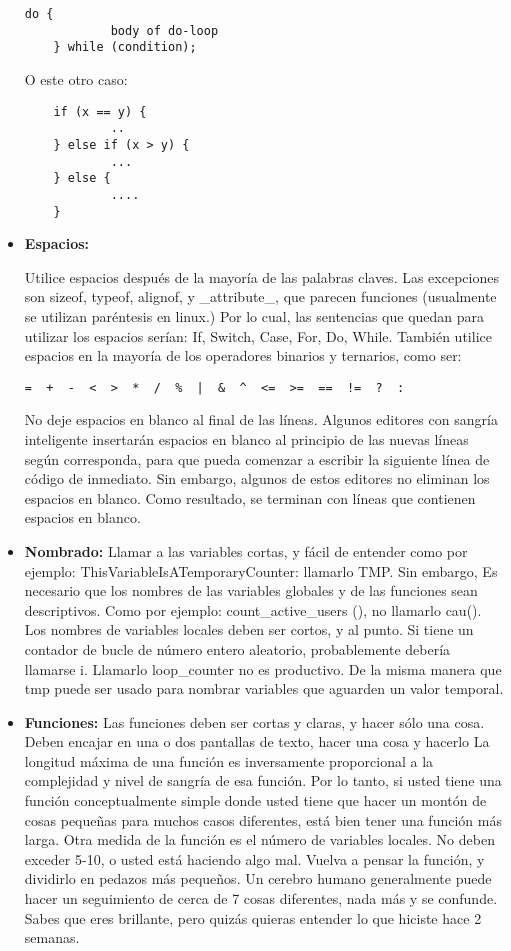 \begin{itemize}
\begin{verbatim}
do {
	        body of do-loop
	} while (condition);
\end{verbatim}
O este otro caso:
\begin{verbatim}
	if (x == y) {
	        ..
	} else if (x > y) {
	        ...
	} else {
	        ....
	}
\end{verbatim}


\item\textbf{Espacios:}
{Utilice espacios después de la mayoría de las palabras claves. Las excepciones son sizeof, typeof, alignof, y \_attribute\_, que parecen funciones (usualmente se utilizan paréntesis en linux.)
Por lo cual, las sentencias que quedan para utilizar los espacios serían: If, Switch, Case, For, Do, While.
También utilice espacios en la mayoría de los operadores binarios y ternarios, como ser: 
\begin{verbatim}
=  +  -  <  >  *  /  %  |  &  ^  <=  >=  ==  !=  ?  :    
\end{verbatim}

No deje espacios en blanco al final de las líneas. Algunos editores con sangría inteligente insertarán espacios en blanco al principio de las nuevas líneas según corresponda, para que pueda comenzar a escribir la siguiente línea de código de inmediato. Sin embargo, algunos de estos editores no eliminan los espacios en blanco. Como resultado, se terminan con líneas que contienen espacios en blanco.
}


\item\textbf{Nombrado:}
{Llamar a las variables cortas, y fácil de entender como por ejemplo:
ThisVariableIsATemporaryCounter: llamarlo TMP.
Sin embargo, Es necesario que los nombres de las variables globales y de las funciones sean descriptivos. Como por ejemplo: count\_active\_users (), no llamarlo cau().
Los nombres de variables locales deben ser cortos, y al punto. Si tiene un contador de bucle de número entero aleatorio, probablemente debería llamarse i. Llamarlo loop\_counter no es productivo. De la misma manera que tmp puede ser usado para nombrar variables que aguarden un valor temporal.}

\item\textbf{Funciones:}
{Las funciones deben ser cortas y claras, y hacer sólo una cosa. Deben encajar en una o dos pantallas de texto, hacer una cosa y hacerlo
La longitud máxima de una función es inversamente proporcional a la complejidad y nivel de sangría de esa función. Por lo tanto, si usted tiene una función conceptualmente simple donde usted tiene que hacer un montón de cosas pequeñas para muchos casos diferentes, está bien tener una función más larga.
Otra medida de la función es el número de variables locales. No deben exceder 5-10, o usted está haciendo algo mal. Vuelva a pensar la función, y dividirlo en pedazos más pequeños. Un cerebro humano generalmente puede hacer un seguimiento de cerca de 7 cosas diferentes, nada más y se confunde. Sabes que eres brillante, pero quizás quieras entender lo que hiciste hace 2 semanas.}


\end{itemize}
